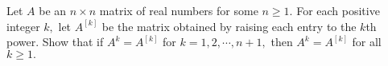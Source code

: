 Let $A$ be an $n\times n$ matrix of real numbers for some $n\ge 1.$ For each positive integer $k,$ let $A^{[k]}$ be the matrix obtained by raising each entry to the $k$th power. Show that if $A^k=A^{[k]}$ for $k=1,2,\cdots,n+1,$ then $A^k=A^{[k]}$ for all $k\ge 1.$